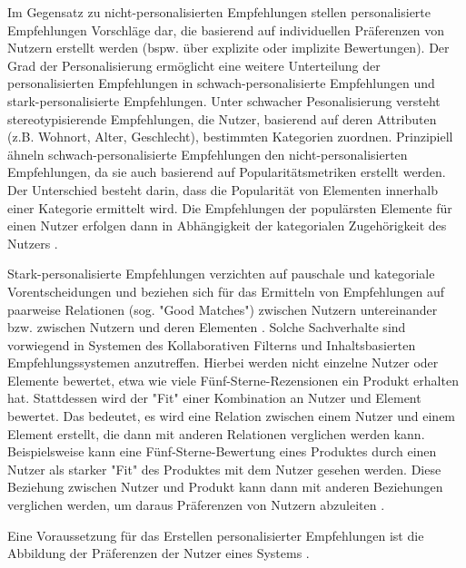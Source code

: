 Im Gegensatz zu nicht-personalisierten Empfehlungen stellen personalisierte Empfehlungen Vorschläge dar, die basierend auf individuellen Präferenzen von Nutzern erstellt werden (bspw. über explizite oder implizite Bewertungen).
Der Grad der Personalisierung ermöglicht eine weitere Unterteilung der personalisierten Empfehlungen in schwach-personalisierte Empfehlungen und stark-personalisierte Empfehlungen.
Unter schwacher Pesonalisierung versteht \textcite[S. 407]{unternährer:article} stereotypisierende Empfehlungen, die Nutzer, basierend auf deren Attributen (z.B. Wohnort, Alter, Geschlecht), bestimmten Kategorien zuordnen.
Prinzipiell ähneln schwach-personalisierte Empfehlungen den nicht-personalisierten Empfehlungen, da sie auch basierend auf Popularitätsmetriken erstellt werden.
Der Unterschied besteht darin, dass die Popularität von Elementen innerhalb einer Kategorie ermittelt wird.
Die Empfehlungen der populärsten Elemente für einen Nutzer erfolgen dann in Abhängigkeit der kategorialen Zugehörigkeit des Nutzers \cite[S. 407ff.]{unternährer:article}.

Stark-personalisierte Empfehlungen verzichten auf pauschale und kategoriale Vorentscheidungen und beziehen sich für das Ermitteln von Empfehlungen auf paarweise Relationen (sog. "Good Matches") zwischen Nutzern untereinander bzw. zwischen Nutzern und deren Elementen \cite[S. 415]{unternährer:article}.
Solche Sachverhalte sind vorwiegend in Systemen des Kollaborativen Filterns und Inhaltsbasierten Empfehlungssystemen anzutreffen.
Hierbei werden nicht einzelne Nutzer oder Elemente bewertet, etwa wie viele Fünf-Sterne-Rezensionen ein Produkt erhalten hat. 
Stattdessen wird der "Fit" einer Kombination an Nutzer und Element bewertet.
Das bedeutet, es wird eine Relation zwischen einem  Nutzer und einem Element erstellt, die dann mit anderen Relationen verglichen werden kann.
Beispielsweise kann eine Fünf-Sterne-Bewertung eines Produktes durch einen Nutzer als starker "Fit" des Produktes mit dem Nutzer gesehen werden.
Diese Beziehung zwischen Nutzer und Produkt kann dann mit anderen Beziehungen verglichen werden, um daraus Präferenzen von Nutzern abzuleiten \cite[S. 417]{unternährer:article}.

Eine Voraussetzung für das Erstellen personalisierter Empfehlungen ist die Abbildung der Präferenzen der Nutzer eines Systems \cite[S. 36]{berkovsky:2:article}.

